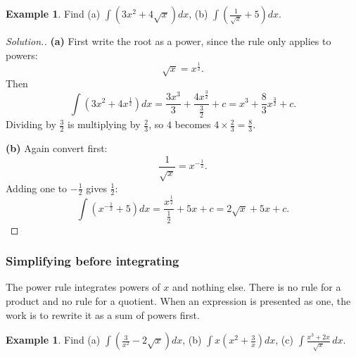 \documentclass[11pt,a4paper]{article}
\theoremstyle{definition}
\newtheorem{example}[thm]{Example}
\newenvironment{solution}
  {\renewcommand{\qedsymbol}{}\begin{proof}[\textit{Solution}.]}
  {\end{proof}}
\begin{document}
\begin{example}
Find \quad (a) $\displaystyle\int\left(3x^2+4\sqrt{x}\right)dx$, \quad
(b) $\displaystyle\int\left(\frac{1}{\sqrt{x}}+5\right)dx$.
\end{example}

\begin{solution}
\textbf{(a)} First write the root as a power, since the rule only applies to powers:
$$\sqrt{x}=x^{\frac{1}{2}}.$$
Then
$$\int\left(3x^2+4x^{\frac{1}{2}}\right)dx
=\frac{3x^{3}}{3}+\frac{4x^{\frac{3}{2}}}{\frac{3}{2}}+c
=x^3+\frac{8}{3}x^{\frac{3}{2}}+c.$$
Dividing by $\frac{3}{2}$ is multiplying by $\frac{2}{3}$, so $4$ becomes
$4\times\frac{2}{3}=\frac{8}{3}$.

\textbf{(b)} Again convert first:
$$\frac{1}{\sqrt{x}}=x^{-\frac{1}{2}}.$$
Adding one to $-\frac{1}{2}$ gives $\frac{1}{2}$:
$$\int\left(x^{-\frac{1}{2}}+5\right)dx=\frac{x^{\frac{1}{2}}}{\frac{1}{2}}+5x+c
=2\sqrt{x}+5x+c.$$
\end{solution}

\subsubsection{Simplifying before integrating}

The power rule integrates powers of $x$ and nothing else. There is no rule for a
product and no rule for a quotient. When an expression is presented as one, the work is
to rewrite it as a sum of powers first.

\begin{example}
Find \quad (a) $\displaystyle\int\left(\frac{3}{x^2}-2\sqrt{x}\right)dx$, \quad
(b) $\displaystyle\int x\left(x^2+\frac{3}{x}\right)dx$, \quad
(c) $\displaystyle\int\frac{x^3+2x}{\sqrt{x}}\,dx$.
\end{example}
\end{document}
